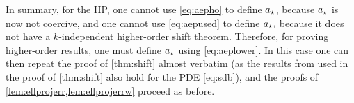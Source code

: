 In summary, for the IIP, one cannot use \cref{eq:aepho} to define $a_{\star}$, because $a_{\star}$ is now not coercive, and one cannot use \cref{eq:aepused} to define $a_{\star},$ because it does not have a $k$-independent higher-order shift theorem. Therefore, for proving higher-order results, one must define $a_{\star}$ using \cref{eq:aeplower}. In this case one can then repeat the proof of \cref{thm:shift} almost verbatim (as the results from \cite{Mc:00} used in the proof of \cref{thm:shift} also hold for the PDE \cref{eq:sdb}), and the proofs of \cref{lem:ellprojerr,lem:ellprojerrw} proceed as before.
\ere




